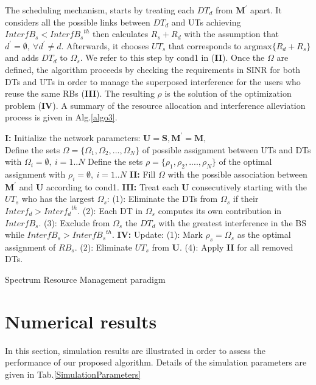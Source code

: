 \documentclass[conference,onecolumn,12pt]{IEEEtran}
\begin{document}
The scheduling mechanism, starts by treating each $DT_d$ from $\mathbf{M^{'}}$ apart. It considers all the possible links between $DT_d$ and UTs achieving $InterfB_s<{InterfB_s}^{th}$ then calculates $R_s+R_d$ with the assumption that $d^{'}=\emptyset , \ \forall d^{'}\neq d$. Afterwards, it chooses $UT_s$ that corresponds to $\mathrm{argmax}\{ R_d + R_s \}$ and adds $DT_d$ to $\Omega_s$. We refer to this step by cond1 in (\textbf{II}). Once the $\Omega$ are defined, the algorithm proceeds by checking the requirements in SINR for both DTs and UTs in order to manage the superposed interference for the users who reuse the same RBs (\textbf{III}). The resulting $\rho$ is the solution of the optimization problem (\textbf{IV}). A summary of the resource allocation and interference alleviation process is given in Alg.\ref{algo3}.
\begin{algorithm}
\DontPrintSemicolon
\textbf{I:} Initialize the network parameters: $\mathbf{U}=\mathbf{S},\mathbf{M}^{'}=\mathbf{M},$\\
Define the sets $\Omega=\{\Omega_1,\Omega_2,...,\Omega_N \}$ of possible assignment between UTs and DTs with $\Omega_i = \emptyset,\ i=1..N$\;
Define the sets $\rho= \{ \rho_1, \rho_2, ....,\rho_N\}$ of the optimal assignment with $\rho_i = \emptyset,\ i=1..N$\;
\textbf{II:} Fill $\Omega$ with the possible association between $\mathbf{M}^{'}$ and $\mathbf{U}$ according to cond1.\;
 {
\textbf{III:} Treat each $\mathbf{U}$ consecutively starting with the $UT_s$ who has the largest $\Omega_s$:\;
(1): Eliminate the DTs from $\Omega_s$ if their $Interf_d >{Interf_d}^{th}$.\;
(2): Each DT in $\Omega_s$ computes its own contribution in $InterfB_s$.\;
(3): Exclude from $\Omega_s$ the $DT_d$ with the greatest interference in the BS while $InterfB_s>{InterfB_s}^{th}$.\;
\textbf{IV:} Update:\;
(1): Mark $\rho_s=\Omega_s$ as the optimal assignment of $RB_s$.\;
(2): Eliminate $UT_s$ from $\mathbf{U}$.\;
(4): Apply \textbf{II} for all removed DTs.
}
\caption{Spectrum Resource Management paradigm\label{algo3}}
\end{algorithm}

\section{Numerical results}
In this section, simulation results are illustrated in order to assess the performance of our proposed algorithm. Details of the simulation parameters are given in Tab.\ref{SimulationParameters}
\end{document}
